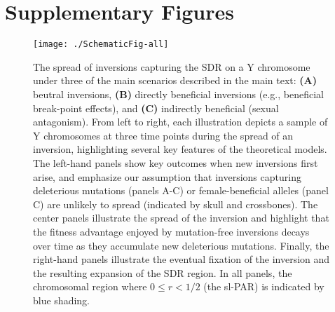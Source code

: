 \documentclass[11pt]{article}
\begin{document}

 \section{Supplementary Figures} \label{SuppFigs}
 \renewcommand{\theequation}{S\arabic{equation}}
 \setcounter{equation}{0}
 \renewcommand{\thefigure}{S\arabic{figure}}
 \setcounter{figure}{0}

\begin{figure}[htbp]
 \centering
 \texttt{[image: ./SchematicFig-all]}
 \caption{The spread of inversions capturing the SDR on a Y chromosome under three of the main scenarios described in the main text: \textbf{(A)} beutral inversions, \textbf{(B)} directly beneficial inversions (e.g., beneficial break-point effects), and \textbf{(C)} indirectly beneficial (sexual antagonism). From left to right, each illustration depicts a sample of Y chromosomes at three time points during the spread of an inversion, highlighting several key features of the theoretical models. The left-hand panels show key outcomes when new inversions first arise, and emphasize our assumption that inversions capturing deleterious mutations (panels A-C) or female-beneficial alleles (panel C) are unlikely to spread (indicated by skull and crossbones). The center panels illustrate the spread of the inversion and highlight that the fitness advantage enjoyed by mutation-free inversions decays over time as they accumulate new deleterious mutations. Finally, the right-hand panels illustrate the eventual fixation of the inversion and the resulting expansion of the SDR region. In all panels, the chromosomal region where $0 \leq r < 1/2$ (the sl-PAR) is indicated by blue shading.}
 \label{fig:diagramFig}
 \end{figure}
\end{document}
